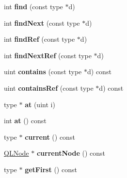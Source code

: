 \begin{DoxyCompactItemize}
\item 
\hypertarget{class_q_list_a7c5e63fc3bbc2a6875b1a9e5e5178184}{int {\bfseries find} (const type $\ast$d)}\label{class_q_list_a7c5e63fc3bbc2a6875b1a9e5e5178184}

\item 
\hypertarget{class_q_list_a2617f4720857b57aef2614f09ff68de1}{int {\bfseries find\-Next} (const type $\ast$d)}\label{class_q_list_a2617f4720857b57aef2614f09ff68de1}

\item 
\hypertarget{class_q_list_a85cd7a89a1c407eccf6525460a94a0f8}{int {\bfseries find\-Ref} (const type $\ast$d)}\label{class_q_list_a85cd7a89a1c407eccf6525460a94a0f8}

\item 
\hypertarget{class_q_list_a28fa0b6057dab271d5e2b053ccdd3953}{int {\bfseries find\-Next\-Ref} (const type $\ast$d)}\label{class_q_list_a28fa0b6057dab271d5e2b053ccdd3953}

\item 
\hypertarget{class_q_list_a9cbdf809be13269d55f7ee417f8dcec3}{uint {\bfseries contains} (const type $\ast$d) const }\label{class_q_list_a9cbdf809be13269d55f7ee417f8dcec3}

\item 
\hypertarget{class_q_list_a447d3917e40cb014d706c038b4688847}{uint {\bfseries contains\-Ref} (const type $\ast$d) const }\label{class_q_list_a447d3917e40cb014d706c038b4688847}

\item 
\hypertarget{class_q_list_a5033e275962d92110b73cc5f722e17f6}{type $\ast$ {\bfseries at} (uint i)}\label{class_q_list_a5033e275962d92110b73cc5f722e17f6}

\item 
\hypertarget{class_q_list_a3bce8d0bb4d6fbaa012b9a61c3910907}{int {\bfseries at} () const }\label{class_q_list_a3bce8d0bb4d6fbaa012b9a61c3910907}

\item 
\hypertarget{class_q_list_ac22b90cda8a81fe45ae121578fcf9726}{type $\ast$ {\bfseries current} () const }\label{class_q_list_ac22b90cda8a81fe45ae121578fcf9726}

\item 
\hypertarget{class_q_list_a2e158bcb82551f59ecc75ffc921d3b91}{\hyperlink{class_q_l_node}{Q\-L\-Node} $\ast$ {\bfseries current\-Node} () const }\label{class_q_list_a2e158bcb82551f59ecc75ffc921d3b91}

\item 
\hypertarget{class_q_list_abfc22f7ca129f8943a271f49d4aafe1f}{type $\ast$ {\bfseries get\-First} () const }\label{class_q_list_abfc22f7ca129f8943a271f49d4aafe1f}


\end{DoxyCompactItemize}

